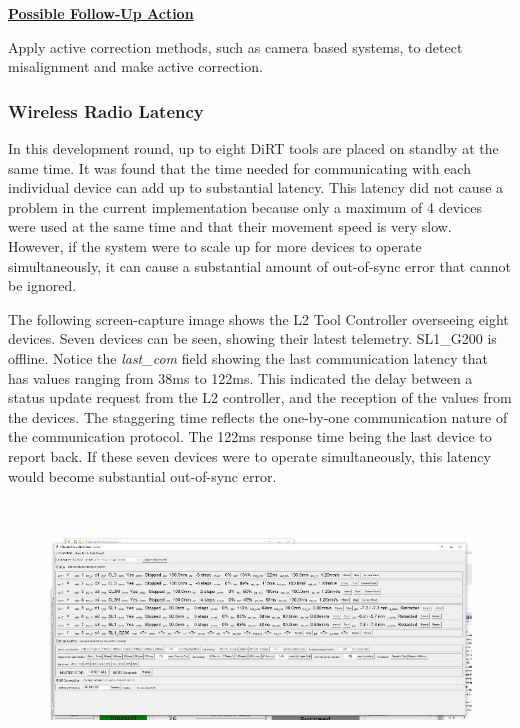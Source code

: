\documentclass[11pt]{book}
\begin{document}
\textbf{\uline{Possible Follow-Up Action}}

Apply active correction methods, such as camera based systems, to detect misalignment and make active correction.

\subsubsection{Wireless Radio Latency}

In this development round, up to eight DiRT tools are placed on standby at the same time. It was found that the time needed for communicating with each individual device can add up to substantial latency. This latency did not cause a problem in the current implementation because only a maximum of 4 devices were used at the same time and that their movement speed is very slow. However, if the system were to scale up for more devices to operate simultaneously, it can cause a substantial amount of out-of-sync error that cannot be ignored.

The following screen-capture image shows the L2 Tool Controller overseeing eight devices. Seven devices can be seen, showing their latest telemetry. SL1\_G200 is offline. Notice the \textit{last\_com }field showing the last communication latency that has values ranging from 38ms to 122ms. This indicated the delay between a status update request from the L2 controller, and the reception of the values from the devices. The staggering time reflects the one-by-one communication nature of the communication protocol. The 122ms response time being the last device to report back. If these seven devices were to operate simultaneously, this latency would become substantial out-of-sync error. 

\begin{figure}[H]
\includegraphics[width=15.92cm,height=6.84cm]{./images/image39.jpeg}
\end{figure}
\end{document}
